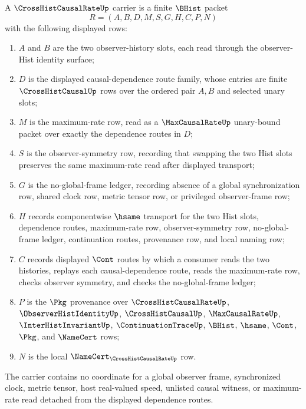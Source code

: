 \begin{definition}
\label{def:cross-hist-causal-rate-carrier}
A $\CrossHistCausalRateUp$ carrier is a finite $\BHist$ packet
$$
R=(A,B,D,M,S,G,H,C,P,N)
$$
with the following displayed rows:
\begin{enumerate}
\item $A$ and $B$ are the two observer-history slots, each read through the observer-Hist identity surface;
\item $D$ is the displayed causal-dependence route family, whose entries are finite $\CrossHistCausalUp$ rows over the ordered pair $A,B$ and selected unary slots;
\item $M$ is the maximum-rate row, read as a $\MaxCausalRateUp$ unary-bound packet over exactly the dependence routes in $D$;
\item $S$ is the observer-symmetry row, recording that swapping the two Hist slots preserves the same maximum-rate read after displayed transport;
\item $G$ is the no-global-frame ledger, recording absence of a global synchronization row, shared clock row, metric tensor row, or privileged observer-frame row;
\item $H$ records componentwise $\hsame$ transport for the two Hist slots, dependence routes, maximum-rate row, observer-symmetry row, no-global-frame ledger, continuation routes, provenance row, and local naming row;
\item $C$ records displayed $\Cont$ routes by which a consumer reads the two histories, replays each causal-dependence route, reads the maximum-rate row, checks observer symmetry, and checks the no-global-frame ledger;
\item $P$ is the $\Pkg$ provenance over $\CrossHistCausalRateUp$, $\ObserverHistIdentityUp$, $\CrossHistCausalUp$, $\MaxCausalRateUp$, $\InterHistInvariantUp$, $\ContinuationTraceUp$, $\BHist$, $\hsame$, $\Cont$, $\Pkg$, and $\NameCert$ rows;
\item $N$ is the local $\NameCert_{\CrossHistCausalRateUp}$ row.
\end{enumerate}
The carrier contains no coordinate for a global observer frame, synchronized clock, metric tensor, host real-valued speed, unlisted causal witness, or maximum-rate read detached from the displayed dependence routes.
\end{definition}

